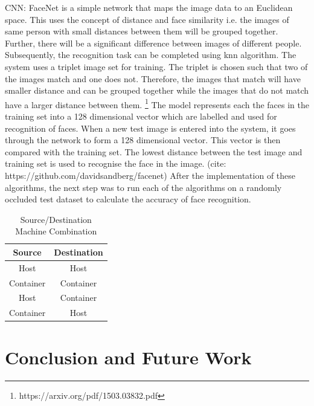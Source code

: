 \documentclass[conference]{IEEEtran}
\begin{document}
CNN: FaceNet is a simple network that maps the image data to an Euclidean space. This uses the concept of distance and face similarity i.e. the images of same person with small distances between them will be grouped together. Further, there will be a significant difference between images of different people. Subsequently, the recognition task can be completed using knn algorithm. The system uses a triplet image set for training. The triplet is chosen such that two of the images match and one does not. Therefore, the images that match will have smaller distance and can be grouped together while the images that do not match have a larger distance between them. \footnote{https://arxiv.org/pdf/1503.03832.pdf} The model represents each the faces in the training set into a 128 dimensional vector which are labelled and used for recognition of faces. When a new test image is entered into the system, it goes through the network to form a 128 dimensional vector. This vector is then compared with the training set. The lowest distance between the test image and training set is used to recognise the face in the image. (cite: https://github.com/davidsandberg/facenet)
After the implementation of these algorithms, the next step was to run each of the algorithms on a randomly occluded test dataset to calculate the accuracy of face recognition. 

\begin{table}[htbp]
\caption{Source/Destination Machine Combination}
\begin{center}
\begin{tabular}{|c|c|}
\hline
\textbf{Source}&\textbf{Destination} \\
\cline{1-2} 
\hline
Host & Host  \\
\hline
Container & Container  \\
\hline
Host & Container \\
\hline
Container & Host \\
\hline
\end{tabular}
\label{table 1}
\end{center}
\end{table}


\section{Conclusion and Future Work}
\label{sec: 4.Conclusion and Future Work}
\end{document}
